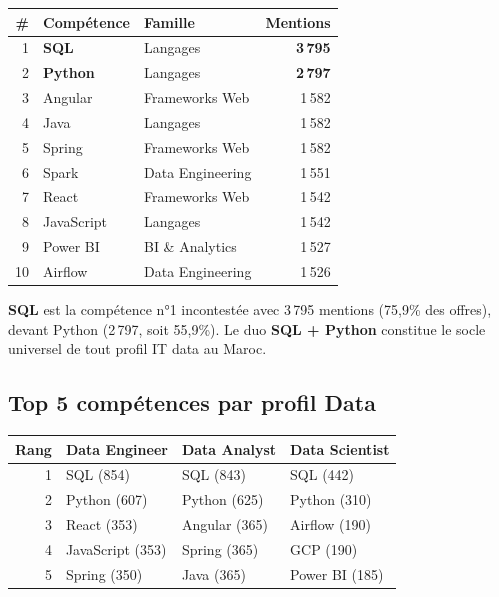 \documentclass[12pt,a4paper]{article}
\begin{document}
\begin{center}
\renewcommand{\arraystretch}{1.3}
\begin{tabularx}{\textwidth}{r l l r}
\toprule
\textbf{\#} & \textbf{Compétence} & \textbf{Famille} & \textbf{Mentions} \\
\midrule
1 & \textbf{SQL} & Langages & \textbf{3\,795} \\
2 & \textbf{Python} & Langages & \textbf{2\,797} \\
3 & Angular & Frameworks Web & 1\,582 \\
4 & Java & Langages & 1\,582 \\
5 & Spring & Frameworks Web & 1\,582 \\
6 & Spark & Data Engineering & 1\,551 \\
7 & React & Frameworks Web & 1\,542 \\
8 & JavaScript & Langages & 1\,542 \\
9 & Power BI & BI \& Analytics & 1\,527 \\
10 & Airflow & Data Engineering & 1\,526 \\
\bottomrule
\end{tabularx}
\end{center}

\textbf{SQL} est la compétence n°1 incontestée avec 3\,795 mentions (75,9\% des offres), devant Python (2\,797, soit 55,9\%). Le duo \textbf{SQL + Python} constitue le socle universel de tout profil IT data au Maroc.

\subsection{Top 5 compétences par profil Data}

\begin{center}
\renewcommand{\arraystretch}{1.3}
\begin{tabularx}{\textwidth}{r X X X}
\toprule
\textbf{Rang} & \textbf{Data Engineer} & \textbf{Data Analyst} & \textbf{Data Scientist} \\
\midrule
1 & SQL (854) & SQL (843) & SQL (442) \\
2 & Python (607) & Python (625) & Python (310) \\
3 & React (353) & Angular (365) & Airflow (190) \\
4 & JavaScript (353) & Spring (365) & GCP (190) \\
5 & Spring (350) & Java (365) & Power BI (185) \\
\bottomrule
\end{tabularx}
\end{center}
\end{document}
